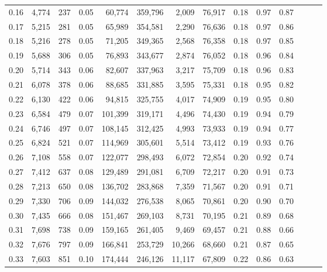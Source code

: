 \begin{tabular}{rrrrrrrrrrrrrr}
0.16 &   4,774 &    237 &  0.05 &   60,774 &  359,796 &   2,009 &  76,917 &  0.18 &  0.97 &      0.87 \\
0.17 &   5,215 &    281 &  0.05 &   65,989 &  354,581 &   2,290 &  76,636 &  0.18 &  0.97 &      0.86 \\
0.18 &   5,216 &    278 &  0.05 &   71,205 &  349,365 &   2,568 &  76,358 &  0.18 &  0.97 &      0.85 \\
0.19 &   5,688 &    306 &  0.05 &   76,893 &  343,677 &   2,874 &  76,052 &  0.18 &  0.96 &      0.84 \\
0.20 &   5,714 &    343 &  0.06 &   82,607 &  337,963 &   3,217 &  75,709 &  0.18 &  0.96 &      0.83 \\
0.21 &   6,078 &    378 &  0.06 &   88,685 &  331,885 &   3,595 &  75,331 &  0.18 &  0.95 &      0.82 \\
0.22 &   6,130 &    422 &  0.06 &   94,815 &  325,755 &   4,017 &  74,909 &  0.19 &  0.95 &      0.80 \\
0.23 &   6,584 &    479 &  0.07 &  101,399 &  319,171 &   4,496 &  74,430 &  0.19 &  0.94 &      0.79 \\
0.24 &   6,746 &    497 &  0.07 &  108,145 &  312,425 &   4,993 &  73,933 &  0.19 &  0.94 &      0.77 \\
0.25 &   6,824 &    521 &  0.07 &  114,969 &  305,601 &   5,514 &  73,412 &  0.19 &  0.93 &      0.76 \\
0.26 &   7,108 &    558 &  0.07 &  122,077 &  298,493 &   6,072 &  72,854 &  0.20 &  0.92 &      0.74 \\
0.27 &   7,412 &    637 &  0.08 &  129,489 &  291,081 &   6,709 &  72,217 &  0.20 &  0.91 &      0.73 \\
0.28 &   7,213 &    650 &  0.08 &  136,702 &  283,868 &   7,359 &  71,567 &  0.20 &  0.91 &      0.71 \\
0.29 &   7,330 &    706 &  0.09 &  144,032 &  276,538 &   8,065 &  70,861 &  0.20 &  0.90 &      0.70 \\
0.30 &   7,435 &    666 &  0.08 &  151,467 &  269,103 &   8,731 &  70,195 &  0.21 &  0.89 &      0.68 \\
0.31 &   7,698 &    738 &  0.09 &  159,165 &  261,405 &   9,469 &  69,457 &  0.21 &  0.88 &      0.66 \\
0.32 &   7,676 &    797 &  0.09 &  166,841 &  253,729 &  10,266 &  68,660 &  0.21 &  0.87 &      0.65 \\
0.33 &   7,603 &    851 &  0.10 &  174,444 &  246,126 &  11,117 &  67,809 &  0.22 &  0.86 &      0.63 \\

\end{tabular}
